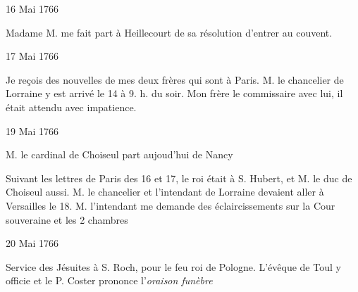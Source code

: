                      \begin{diary}{16 Mai 1766}{}
                        
                        
                           Madame M.  me fait part à Heillecourt
                           de sa résolution d'entrer au couvent. \bigskip
        
        
                     \end{diary}

                     \begin{diary}{17 Mai 1766}{}
                        
                         Je reçois des nouvelles de mes deux frères
                           qui sont à Paris. M. le chancelier de Lorraine
                           y est arrivé le 14 à 9. h. du soir.
                              Mon
                              frère le commissaire avec lui, il était attendu
                           avec impatience. \bigskip
        
        
                     \end{diary}

                     \begin{diary}{19 Mai 1766}{}
                        
                        
                           M. le cardinal de Choiseul part
                           aujoud'hui
                           de Nancy
                        \bigskip
        
        
                        
                           Suivant les lettres de Paris des
                              16 et 17,
                           le roi était à
                              S. Hubert, et M. le duc de
                              Choiseul aussi. M.
                              le chancelier et l'intendant
                              de Lorraine devaient aller à Versailles
                           le 18.
                           M. l'intendant me demande des éclaircissements
                           sur la Cour souveraine et les 2 chambres
                        \bigskip
        
        
                     \end{diary}
                     
                     \begin{diary}{20 Mai 1766}{}
                        
                         Service des Jésuites à S.
                              Roch, pour le feu
                              roi de Pologne. L'évêque de Toul
                           y officie et
                           le P. Coster prononce
                                 l'\emph{oraison funèbre}
                        \bigskip
        
        
                     \end{diary}

